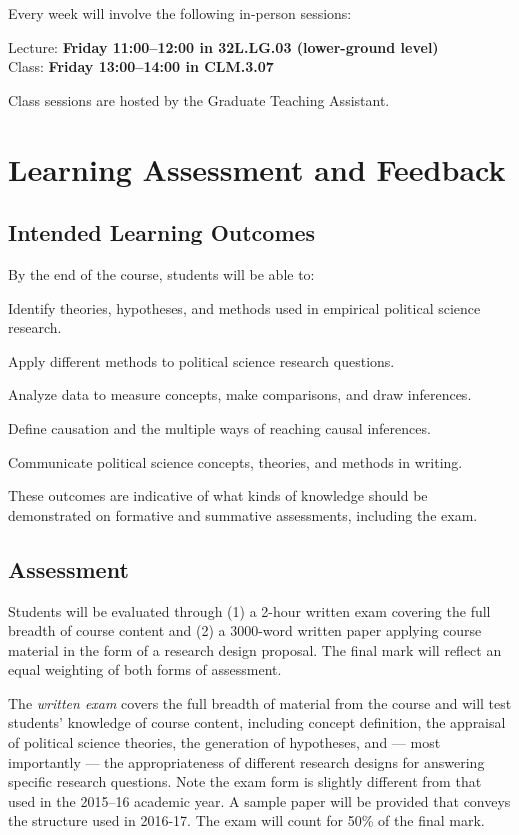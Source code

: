 \documentclass[12pt,a4paper]{article}
\begin{document}
Every week will involve the following in-person sessions:

	\begin{center}
	Lecture: \textbf{Friday 11:00--12:00 in 32L.LG.03 (lower-ground level)}\\
	Class: \textbf{Friday 13:00--14:00 in CLM.3.07}
	\end{center}

Class sessions are hosted by the Graduate Teaching Assistant.

\section{Learning Assessment and Feedback}

\subsection{Intended Learning Outcomes}

By the end of the course, students will be able to:

\begin{enumerate*}
\item Identify theories, hypotheses, and methods used in empirical political science research.
\item Apply different methods to political science research questions.
\item Analyze data to measure concepts, make comparisons, and draw inferences.
\item Define causation and the multiple ways of reaching causal inferences.
\item Communicate political science concepts, theories, and methods in writing.
\end{enumerate*}

These outcomes are indicative of what kinds of knowledge should be demonstrated on formative and summative assessments, including the exam.


\subsection{Assessment}

Students will be evaluated through (1) a 2-hour written exam covering the full breadth of course content and (2) a 3000-word written paper applying course material in the form of a research design proposal. The final mark will reflect an equal weighting of both forms of assessment.

The \textit{written exam} covers the full breadth of material from the course and will test students' knowledge of course content, including concept definition, the appraisal of political science theories, the generation of hypotheses, and --- most importantly --- the appropriateness of different research designs for answering specific research questions. Note the exam form is slightly different from that used in the 2015--16 academic year. A sample paper will be provided that conveys the structure used in 2016-17. The exam will count for 50\% of the final mark.
\end{document}

